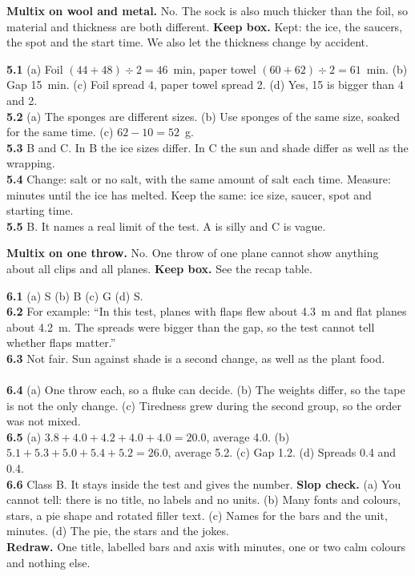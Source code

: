 \textbf{Multix on wool and metal.} No. The sock is also much thicker than the foil, so material and thickness are both different. \textbf{Keep box.} Kept: the ice, the saucers, the spot and the start time. We also let the thickness change by accident.

\textbf{5.1} (a) Foil $(44+48)\div2=46$~min, paper towel $(60+62)\div2=61$~min. (b) Gap 15~min. (c) Foil spread 4, paper towel spread 2. (d) Yes, 15 is bigger than 4 and 2.\\
\textbf{5.2} (a) The sponges are different sizes. (b) Use sponges of the same size, soaked for the same time. (c) $62-10=52$~g.\\
\textbf{5.3} B and C. In B the ice sizes differ. In C the sun and shade differ as well as the wrapping.\\
\textbf{5.4} Change: salt or no salt, with the same amount of salt each time. Measure: minutes until the ice has melted. Keep the same: ice size, saucer, spot and starting time.\\
\textbf{5.5} B. It names a real limit of the test. A is silly and C is vague.

\textbf{Multix on one throw.} No. One throw of one plane cannot show anything about all clips and all planes. \textbf{Keep box.} See the recap table.

\textbf{6.1} (a) S (b) B (c) G (d) S.\\
\textbf{6.2} For example: ``In this test, planes with flaps flew about 4.3~m and flat planes about 4.2~m. The spreads were bigger than the gap, so the test cannot tell whether flaps matter.''\\
\textbf{6.3} Not fair. Sun against shade is a second change, as well as the plant food.\\\\
\textbf{6.4} (a) One throw each, so a fluke can decide. (b) The weights differ, so the tape is not the only change. (c) Tiredness grew during the second group, so the order was not mixed.\\
\textbf{6.5} (a) $3.8+4.0+4.2+4.0+4.0=20.0$, average 4.0. (b) $5.1+5.3+5.0+5.4+5.2=26.0$, average 5.2. (c) Gap 1.2. (d) Spreads 0.4 and 0.4.\\
\textbf{6.6} Class B. It stays inside the test and gives the number.
\textbf{Slop check.} (a) You cannot tell: there is no title, no labels and no units. (b) Many fonts and colours, stars, a pie shape and rotated filler text. (c) Names for the bars and the unit, minutes. (d) The pie, the stars and the jokes.\\
\textbf{Redraw.} One title, labelled bars and axis with minutes, one or two calm colours and nothing else.

